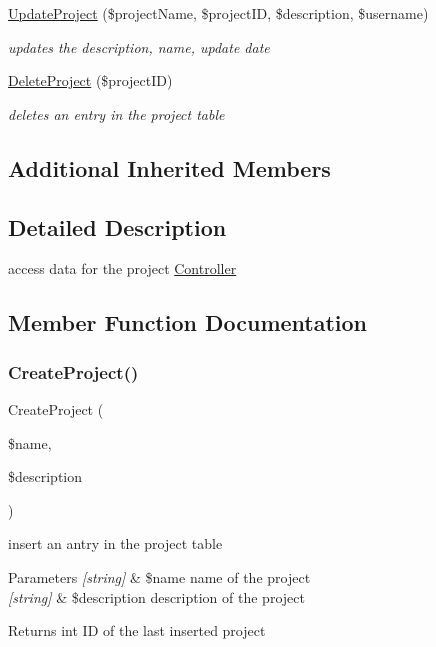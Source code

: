 \begin{DoxyCompactItemize}
\hyperlink{class_project_d_a_o_aaaadaf1c606b537d83daeb2995c86062}{Update\+Project} (\$project\+Name, \$project\+ID, \$description, \$username)
\begin{DoxyCompactList}\small\item\em updates the description, name, update date \end{DoxyCompactList}\item 
\hyperlink{class_project_d_a_o_a9aab18deae687e16af661f2ee28479af}{Delete\+Project} (\$project\+ID)
\begin{DoxyCompactList}\small\item\em deletes an entry in the project table \end{DoxyCompactList}\end{DoxyCompactItemize}
\subsection*{Additional Inherited Members}


\subsection{Detailed Description}
access data for the project \hyperlink{class_controller}{Controller} 

\subsection{Member Function Documentation}
\mbox{\label{class_project_d_a_o_ab33602f01ad5d9926c26dda5942292a3}} 
\subsubsection{\texorpdfstring{Create\+Project()}{CreateProject()}}
{\footnotesize\ttfamily Create\+Project (\begin{DoxyParamCaption}\item[{}]{\$name,  }\item[{}]{\$description }\end{DoxyParamCaption})}



insert an antry in the project table 


\begin{DoxyParams}{Parameters}
{\em \mbox{[}string\mbox{]}} & \$name name of the project \\
\hline
{\em \mbox{[}string\mbox{]}} & \$description description of the project\\
\hline
\end{DoxyParams}
\begin{DoxyReturn}{Returns}
int ID of the last inserted project 
\end{DoxyReturn}
\mbox{\label{class_project_d_a_o_a9aab18deae687e16af661f2ee28479af}} 
